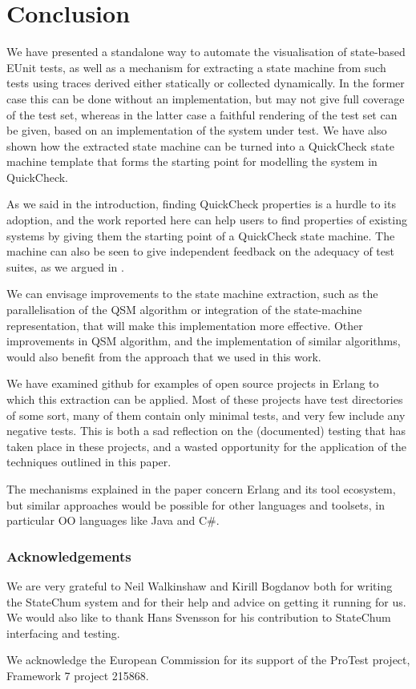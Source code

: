 \documentclass[]{sigplanconf}
\begin{document}
\section{Conclusion}
\label{conc}


We have presented a standalone way to automate the visualisation
of state-based EUnit tests, as well as a mechanism for extracting a state machine from such tests using traces derived either statically or collected dynamically. In the former case this can be done without an implementation, but may not give full coverage of the test set, whereas in the latter case a faithful rendering of the test set can be given, based on an implementation of the system under test.
We have also shown how the extracted state machine can be turned into a QuickCheck state machine template that forms the starting point for modelling the system in QuickCheck. 

As we said in the introduction, finding QuickCheck properties is a hurdle to its adoption, and the work reported here can help users to find properties of existing systems by giving them the starting point of a QuickCheck state machine. The machine can also be seen to give independent feedback on the adequacy of test suites, as we argued in \cite{arts2010test}.

We can envisage improvements to the state machine extraction, such as the  parallelisation of the QSM
algorithm or integration of the state-machine representation, that
will make this implementation more effective. Other improvements
in QSM algorithm, and the implementation of similar algorithms,
would also benefit from the approach that we
used in this work.

We have examined github for examples of open source projects in Erlang to which this extraction can be applied. Most of these projects have test directories of some sort, many of them contain only minimal tests, and very few include any negative tests. This is both a sad reflection on the (documented) testing that has taken place in these projects, and a wasted opportunity for the application of the techniques outlined in this paper.

The mechanisms explained in the paper concern Erlang and its tool ecosystem, but similar approaches would be possible for other languages and toolsets, in particular OO languages like Java and C\#.


\subsubsection*{Acknowledgements}
We are very grateful to Neil Walkinshaw and Kirill Bogdanov both for writing the StateChum system and for their help and advice on getting it running for us. We would also like to thank Hans Svensson for his contribution to StateChum interfacing and testing. 

We acknowledge the European Commission for its support of the ProTest project, Framework 7 project 215868. 



{}

\end{document}
